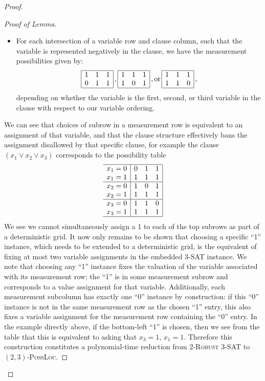 \documentclass[reprint]{revtex4-1}
\theoremstyle{definition}
\begin{document}
\begin{proof}
\begin{proof}[Proof of Lemma]
\begin{itemize}
\item For each intersection of a variable row and clause column, such that the variable is represented negatively in the clause, we have the measurement possibilities given by:
\begin{equation*}
\begin{array}{  | c c  c|}
\hline
 1 & 1 & 1 \\
 0 & 1& 1 \\ \hline
 \end{array}\, ,
 \begin{array}{  | c c  c|}
\hline
 1 &1 & 1 \\
 1 & 0& 1 \\ \hline
 \end{array} \, ,
 \mbox{or} \,
 \begin{array}{  | c c  c|}
\hline
 1 & 1 & 1\\
 1 & 1& 0 \\ \hline
 \end{array}\, ,
 \end{equation*}
depending on whether the variable is the first, second, or third variable in the clause with respect to our variable ordering.
\end{itemize}
We can see that choices of subrow in a measurement row is equivalent to an assignment of that variable, and that the clause structure effectively bans the assignment disallowed by that specific clause, for example the clause $(x_1 \vee x_2 \vee x_3)$ corresponds to the possibility table
\begin{equation*}
\begin{array}{c  | c c  c|}
\hline
 x_1=0&0 & 1 & 1 \\
 x_1=1&1 & 1& 1 \\ \hline
 x_2=0&1 &0 & 1 \\
x_2=1& 1 & 1& 1 \\ \hline
x_3=0& 1 & 1 & 0\\
x_3=1& 1 & 1& 1 \\ \hline
 \end{array}
 \end{equation*}
We see we cannot simultaneously assign a 1 to each of the top subrows as part of a deterministic grid. It now only remains to be shown that choosing a specific ``1'' instance, which needs to be extended to a deterministic grid, is the equivalent of fixing at most two variable assignments in the embedded \textsc{3-SAT} instance. We note that choosing any ``1'' instance fixes the valuation of the variable associated with its measurement row; the ``1'' is in some measurement subrow and corresponds to a value assignment for that variable. Additionally, each measurement subcolumn has exactly one ``0'' instance by construction: if this ``0'' instance is not in the same measurement row as the chosen ``1'' entry, this also fixes a variable assignment for the measurement row containing the ``0'' entry. In the example directly above, if the bottom-left ``1'' is chosen, then we see from the table that this is equivalent to asking that $x_3=1$, $x_1=1$. Therefore this construction constitutes a polynomial-time reduction from \textsc{2-Robust 3-SAT} to $(2,3)$\textsc{-PossLoc}.



\end{proof}
\end{proof}
\end{document}
